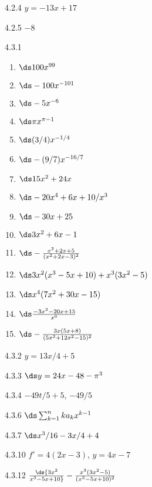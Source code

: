\begin{Answer}{4.2.4}
	$y=-13x+17$
\end{Answer}
\begin{Answer}{4.2.5}
	$-8$
\end{Answer}
\begin{Answer}{4.3.1}
\begin{multicols}{3}
\begin{enumerate}
	\item	$\ds 100x^{99}$
	\item	$\ds -100x^{-101}$
	\item	$\ds -5x^{-6}$
	\item	$\ds \pi x^{\pi-1}$
	\item	$\ds (3/4)x^{-1/4}$
	\item	$\ds -(9/7)x^{-16/7}$
	\item	$\ds 15x^2+24x$
	\item	$\ds -20x^4+6x+10/x^3$
	\item	$\ds -30x+25$
	\item	$\ds 3x^2+6x-1$
	\item	$\ds -\frac{x^2+2x+5}{(x^2+2x-3)^2}$
	\item	$\ds 3x^2(x^3-5x+10)+x^3(3x^2-5)$
	\item	$\ds x^4(7x^2+30x-15)$
	\item	$\ds\frac{-3x^2-20x+15}{x^6}$
	\item	$\ds -\frac{3x(5x+8)}{(5x^3+12x^2-15)^2}$
\end{enumerate}
\end{multicols}
\end{Answer}
\begin{Answer}{4.3.2}
$y=13x/4+5$
\end{Answer}
\begin{Answer}{4.3.3}
$\ds y=24x-48-\pi^3$
\end{Answer}
\begin{Answer}{4.3.4}
$-49t/5+5$, $-49/5$
\end{Answer}
\begin{Answer}{4.3.6}
$\ds\sum_{k=1}^n ka_kx^{k-1}$
\end{Answer}
\begin{Answer}{4.3.7}
$\ds x^3/16-3x/4+4$
\end{Answer}
\begin{Answer}{4.3.10}
$f'=4(2x-3)$, $y=4x-7$
\end{Answer}
\begin{Answer}{4.3.12}
$\ds {3x^2\over x^3-5x+10}-{x^3(3x^2-5)\over (x^3-5x+10)^2}$
\end{Answer}
